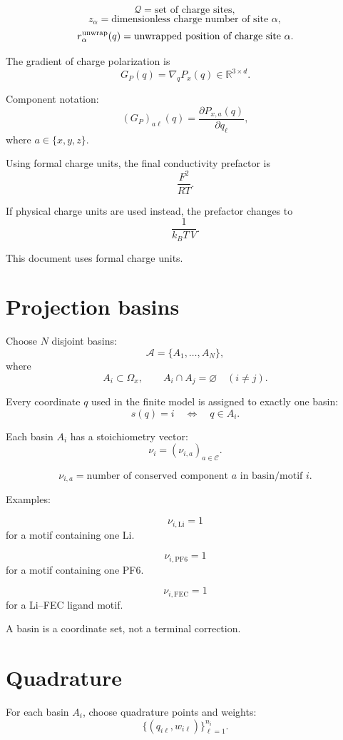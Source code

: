 \documentclass[11pt]{article}
\newcommand{\R}{\mathbb R}
\begin{document}
  \[
  \mathcal Q
  =
  \text{set of charge sites},
  \]
  \[
  z_\alpha
  =
  \text{dimensionless charge number of site }\alpha,
  \]
  \[
  r_\alpha^{\rm unwrap}(q)
  =
  \text{unwrapped position of charge site }\alpha.
  \]

  The gradient of charge polarization is
  \[
  G_P(q)=\nabla_q P_x(q)\in\R^{3\times d}.
  \]

  Component notation:
  \[
  (G_P)_{a\ell}(q)
  =
  \frac{\partial P_{x,a}(q)}{\partial q_\ell},
  \]
  where \(a\in\{x,y,z\}\).

  Using formal charge units, the final conductivity prefactor is
  \[
  \frac{F^2}{RT}.
  \]

  If physical charge units are used instead, the prefactor changes to
  \[
  \frac{1}{k_BT\,V}.
  \]

  This document uses formal charge units.

  \section{Projection basins}

  Choose \(N\) disjoint basins:
  \[
  \mathcal A=\{A_1,\ldots,A_N\},
  \]
  where
  \[
  A_i\subset\Omega_x,
  \qquad
  A_i\cap A_j=\varnothing \quad(i\ne j).
  \]

  Every coordinate \(q\) used in the finite model is assigned to exactly one
  basin:
  \[
  s(q)=i
  \quad
  \Longleftrightarrow
  \quad
  q\in A_i.
  \]

  Each basin \(A_i\) has a stoichiometry vector:
  \[
  \nu_i=(\nu_{i,a})_{a\in\mathcal C}.
  \]

  \[
  \nu_{i,a}
  =
  \text{number of conserved component }a\text{ in basin/motif }i.
  \]

  Examples:

  \[
  \nu_{i,\mathrm{Li}}=1
  \]
  for a motif containing one Li.

  \[
  \nu_{i,\mathrm{PF6}}=1
  \]
  for a motif containing one PF6.

  \[
  \nu_{i,\mathrm{FEC}}=1
  \]
  for a Li--FEC ligand motif.

  A basin is a coordinate set, not a terminal correction.

  \section{Quadrature}

  For each basin \(A_i\), choose quadrature points and weights:
  \[
  \{(q_{i\ell},w_{i\ell})\}_{\ell=1}^{n_i}.
  \]
\end{document}
